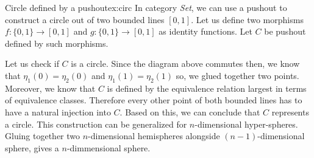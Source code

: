 \begin{example}{Circle defined by a pushout}{ex:circ}
In category \emph{Set}, we can use a pushout to construct a circle out of two bounded lines $[0, 1]$. Let us define two morphisms $f: \{0, 1\} \rightarrow  [0, 1]$ and $g: \{0, 1\} \rightarrow  [0, 1]$ as identity functions. Let $C$ be pushout defined by such morphisms.

\begin{center}
\end{center}
Let us check if $C$ is a circle. Since the diagram above commutes then, we know that $\eta_1(0) = \eta_2(0)$ and $\eta_1(1) = \eta_2(1)$ so, we glued together two points. Moreover, we know that $C$ is defined by the equivalence relation largest in terms of equivalence classes. Therefore every other point of both bounded lines has to have a natural injection into $C$. Based on this, we can conclude that $C$ represents a circle. This construction can be generalized for $n$-dimensional hyper-spheres. Gluing together two $n$-dimensional hemispheres alongside $(n-1)$-dimensional sphere, gives a $n$-dimmensional sphere.
\end{example}

